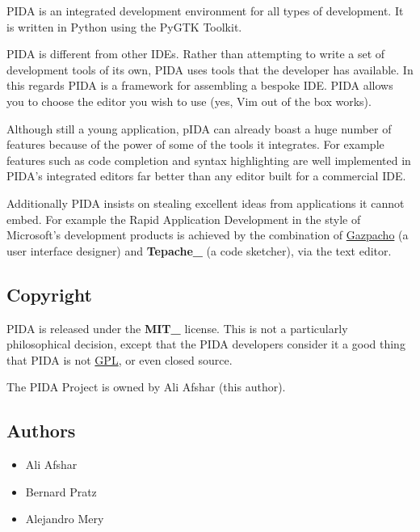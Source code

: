\documentclass[10pt,a4paper,english]{article}
\begin{document}
PIDA is an integrated development environment for all types of development. It
is written in Python using the PyGTK Toolkit.

PIDA is different from other IDEs. Rather than attempting to write a set of
development tools of its own, PIDA uses tools that the developer has available.
In this regards PIDA is a framework for assembling a bespoke IDE. PIDA allows
you to choose the editor you wish to use (yes, Vim out of the box works).

Although still a young application, pIDA can already boast a huge number of
features because of the power of some of the tools it integrates. For example
features such as code completion and syntax highlighting are well implemented in
PIDA's integrated editors far better than any editor built for a commercial
IDE.

Additionally PIDA insists on stealing excellent ideas from applications it
cannot embed. For example the Rapid Application Development in the style of
Microsoft's development products is achieved by the combination of \href{http://gazpacho.sicem.biz/}{Gazpacho} (a
user interface designer) and {\color{red}\bfseries{}Tepache{\_}} (a code sketcher), via the text editor.



\hypertarget{copyright}{}
\subsection*{Copyright}

PIDA is released under the {\color{red}\bfseries{}MIT{\_}} license. This is not a particularly philosophical
decision, except that the PIDA developers consider it a good thing that PIDA is
not \href{http://www.opensource.org/licenses/gpl-license.php}{GPL}, or even closed source.

The PIDA Project is owned by Ali Afshar (this author).



\hypertarget{authors}{}
\subsection*{Authors}
\begin{itemize}
\item {} 
Ali Afshar

\item {} 
Bernard Pratz

\item {} 
Alejandro Mery

\end{itemize}
\end{document}
